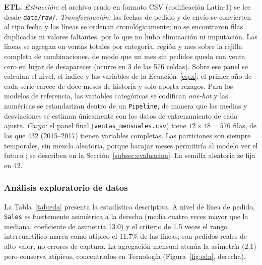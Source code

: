 \documentclass[pdflatex,sn-mathphys-num]{sn-jnl}
\theoremstyle{thmstyleone}
\begin{document}
\textbf{ETL.} \textit{Extracción:} el archivo crudo en formato CSV (codificación Latin-1) se lee desde \texttt{data/raw/}. \textit{Transformación:} las fechas de pedido y de envío se convierten al tipo fecha y las líneas se ordenan cronológicamente; no se encontraron filas duplicadas ni valores faltantes, por lo que no hubo eliminación ni imputación. Las líneas se agregan en ventas totales por categoría, región y mes sobre la rejilla completa de combinaciones, de modo que un mes sin pedidos queda con venta cero en lugar de desaparecer (ocurre en 3 de las 576 celdas). Sobre ese panel se calculan el nivel, el índice y las variables de la Ecuación~\eqref{eq:x}; el primer año de cada serie carece de doce meses de historia y solo aporta rezagos. Para los modelos de referencia, las variables categóricas se codifican \emph{one-hot} y las numéricas se estandarizan dentro de un \texttt{Pipeline}, de manera que las medias y desviaciones se estiman únicamente con los datos de entrenamiento de cada ajuste. \textit{Carga:} el panel final (\texttt{ventas\_mensuales.csv}) tiene $12\times48=576$ filas, de las que 432 (2015--2017) tienen variables completas. Las particiones son siempre temporales, sin mezcla aleatoria, porque barajar meses permitiría al modelo ver el futuro \cite{bergmeir2018,cerqueira2020}; se describen en la Sección~\ref{subsec:evaluacion}. La semilla aleatoria se fija en 42.

\subsubsection{Análisis exploratorio de datos}\label{subsubsec:eda}

La Tabla~\ref{tab:eda} presenta la estadística descriptiva. A nivel de línea de pedido, \texttt{Sales} es fuertemente asimétrica a la derecha (media cuatro veces mayor que la mediana, coeficiente de asimetría 13.0) y el criterio de 1.5 veces el rango intercuartílico marca como atípico el 11.7\% de las líneas; son pedidos reales de alto valor, no errores de captura. La agregación mensual atenúa la asimetría (2.1) pero conserva atípicos, concentrados en Tecnología (Figura~\ref{fig:eda}, derecha).
\end{document}
